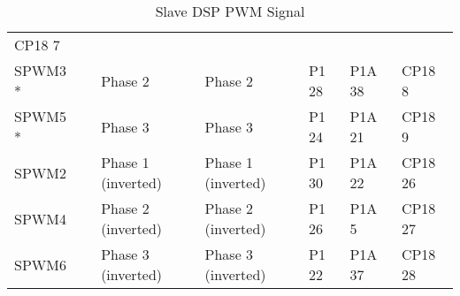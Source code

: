 \begin{table}[H]
\begin{adjustbox}{width=1\textwidth}
\begin{tabular}{|lllllll|}
  CP18 7 \\
\multicolumn{1}{|l|}{SPWM3 *} &
  \multicolumn{1}{l|}{} &
  \multicolumn{1}{l|}{Phase 2} &
  \multicolumn{1}{l|}{Phase 2} &
  \multicolumn{1}{l|}{P1 28} &
  \multicolumn{1}{l|}{P1A 38} &
  CP18 8 \\
\multicolumn{1}{|l|}{SPWM5 *} &
  \multicolumn{1}{l|}{} &
  \multicolumn{1}{l|}{Phase 3} &
  \multicolumn{1}{l|}{Phase 3} &
  \multicolumn{1}{l|}{P1 24} &
  \multicolumn{1}{l|}{P1A 21} &
  CP18 9 \\
\multicolumn{1}{|l|}{SPWM2} &
  \multicolumn{1}{l|}{} &
  \multicolumn{1}{l|}{Phase 1 (inverted)} &
  \multicolumn{1}{l|}{Phase 1 (inverted)} &
  \multicolumn{1}{l|}{P1 30} &
  \multicolumn{1}{l|}{P1A 22} &
  CP18 26 \\
\multicolumn{1}{|l|}{SPWM4} &
  \multicolumn{1}{l|}{} &
  \multicolumn{1}{l|}{Phase 2 (inverted)} &
  \multicolumn{1}{l|}{Phase 2 (inverted)} &
  \multicolumn{1}{l|}{P1 26} &
  \multicolumn{1}{l|}{P1A 5} &
  CP18 27 \\
\multicolumn{1}{|l|}{SPWM6} &
  \multicolumn{1}{l|}{} &
  \multicolumn{1}{l|}{Phase 3 (inverted)} &
  \multicolumn{1}{l|}{Phase 3 (inverted)} &
  \multicolumn{1}{l|}{P1 22} &
  \multicolumn{1}{l|}{P1A 37} &
  CP18 28 \\ \hline
\end{tabular}
\end{adjustbox}
\caption{Slave DSP PWM Signal}
\label{Slave DSP PWM Signal}
\end{table}
